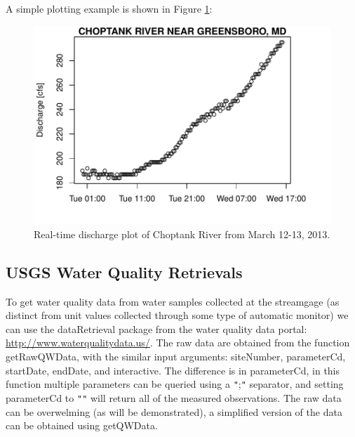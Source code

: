 \documentclass[a4paper,11pt]{article}
\begin{document}
A simple plotting example is shown in Figure \ref{fig:RT}:
\begin{Schunk}
\end{Schunk}
\newpage

\begin{figure}
\begin{center}
\includegraphics{dataRetrieval-fig2}
\end{center}
\caption{Real-time discharge plot of Choptank River from March 12-13, 2013.}
\label{fig:RT}
\end{figure}


\subsection{USGS Water Quality Retrievals}
\label{sec:usgsWQP}
To get water quality data from water samples collected at the streamgage (as distinct from unit values collected through some type of automatic monitor) we can use the dataRetrieval package from the water quality data portal: \url{http://www.waterqualitydata.us/}. The raw data are obtained from the function  getRawQWData, with the similar input arguments: siteNumber, parameterCd, startDate, endDate, and interactive. The difference is in parameterCd, in this function multiple parameters can be queried using a \texttt{"};\texttt{"} separator, and setting parameterCd to \texttt{"}\texttt{"} will return all of the measured observations. The raw data can be overwelming (as will be demonstrated), a simplified version of the data can be obtained using getQWData.
\end{document}
